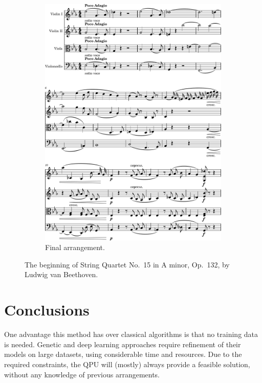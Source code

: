 \documentclass[aps,pra,10pt,twocolumn]{revtex4-2}
\begin{document}
\begin{figure}[h]
\begin{subfigure}[b]{0.5\linewidth}
        \includegraphics[width=\subfigurewidth]{../Figures/excerpt-1.png}
        \caption{Final arrangement.}
        \label{fig:arrangement}
    \end{subfigure}
    \caption{The beginning of String Quartet No.\ 15 in A minor, Op.\ 132, by Ludwig van Beethoven.}
    \label{fig:results}
\end{figure}

\clearpage

\section{Conclusions}

One advantage this method has over classical algorithms is that no training data is needed. Genetic and deep learning approaches require refinement of their models on large datasets, using considerable time and resources. Due to the required constraints, the QPU will (mostly) always provide a feasible solution, without any knowledge of previous arrangements.
\end{document}

